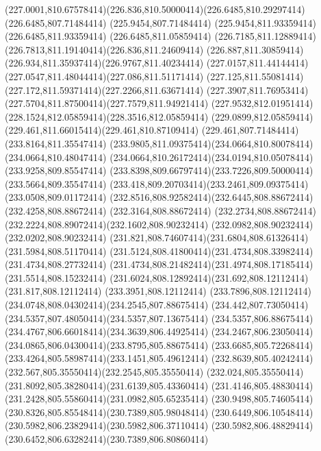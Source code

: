 {{	\curveto(227.0001,810.67578414)(226.836,810.50000414)(226.6485,810.29297414)
	\lineto(226.6485,807.71484414)
	\lineto(225.9454,807.71484414)
	\lineto(225.9454,811.93359414)
	\lineto(226.6485,811.93359414)
	\lineto(226.6485,811.05859414)
	\curveto(226.7185,811.12889414)(226.7813,811.19140414)(226.836,811.24609414)
	\curveto(226.887,811.30859414)(226.934,811.35937414)(226.9767,811.40234414)
	\curveto(227.0157,811.44144414)(227.0547,811.48044414)(227.086,811.51171414)
	\curveto(227.125,811.55081414)(227.172,811.59371414)(227.2266,811.63671414)
	\curveto(227.3907,811.76953414)(227.5704,811.87500414)(227.7579,811.94921414)
	\curveto(227.9532,812.01951414)(228.1524,812.05859414)(228.3516,812.05859414)
	\curveto(229.0899,812.05859414)(229.461,811.66015414)(229.461,810.87109414)
	\lineto(229.461,807.71484414)
	\closepath
	\moveto(233.8164,811.35547414)
	\curveto(233.9805,811.09375414)(234.0664,810.80078414)(234.0664,810.48047414)
	\curveto(234.0664,810.26172414)(234.0194,810.05078414)(233.9258,809.85547414)
	\curveto(233.8398,809.66797414)(233.7226,809.50000414)(233.5664,809.35547414)
	\curveto(233.418,809.20703414)(233.2461,809.09375414)(233.0508,809.01172414)
	\curveto(232.8516,808.92582414)(232.6445,808.88672414)(232.4258,808.88672414)
	\lineto(232.3164,808.88672414)
	\curveto(232.2734,808.88672414)(232.2224,808.89072414)(232.1602,808.90232414)
	\lineto(232.0982,808.90232414)
	\lineto(232.0202,808.90232414)
	\curveto(231.821,808.74607414)(231.6804,808.61326414)(231.5984,808.51170414)
	\curveto(231.5124,808.41800414)(231.4734,808.33982414)(231.4734,808.27732414)
	\curveto(231.4734,808.21482414)(231.4974,808.17185414)(231.5514,808.15232414)
	\curveto(231.6024,808.12892414)(231.692,808.12112414)(231.817,808.12112414)
	\lineto(233.3951,808.12112414)
	\curveto(233.7896,808.12112414)(234.0748,808.04302414)(234.2545,807.88675414)
	\curveto(234.442,807.73050414)(234.5357,807.48050414)(234.5357,807.13675414)
	\curveto(234.5357,806.88675414)(234.4767,806.66018414)(234.3639,806.44925414)
	\curveto(234.2467,806.23050414)(234.0865,806.04300414)(233.8795,805.88675414)
	\curveto(233.6685,805.72268414)(233.4264,805.58987414)(233.1451,805.49612414)
	\curveto(232.8639,805.40242414)(232.567,805.35550414)(232.2545,805.35550414)
	\curveto(232.024,805.35550414)(231.8092,805.38280414)(231.6139,805.43360414)
	\curveto(231.4146,805.48830414)(231.2428,805.55860414)(231.0982,805.65235414)
	\curveto(230.9498,805.74605414)(230.8326,805.85548414)(230.7389,805.98048414)
	\curveto(230.6449,806.10548414)(230.5982,806.23829414)(230.5982,806.37110414)
	\curveto(230.5982,806.48829414)(230.6452,806.63282414)(230.7389,806.80860414)
}}
